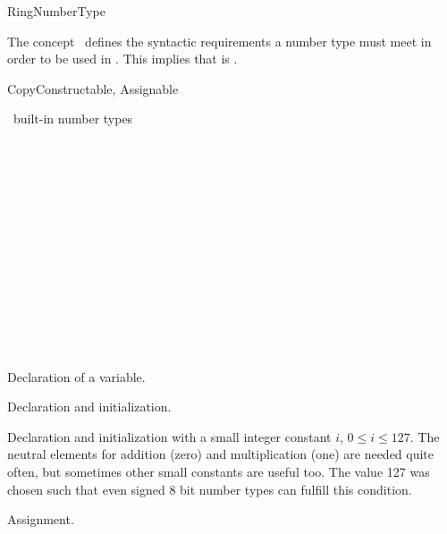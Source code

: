 \begin{ccRefConcept}{RingNumberType}

\ccDefinition

The concept \ccRefName\ defines the syntactic requirements a number type must
meet in order to be used in \cgal.  This implies that
 is 
.

\ccRefines

CopyConstructable, Assignable 


\ccHasModels

\CC\ built-in number types \\
 \\
 \\
 \\
 \\
 \\
 \\
 \\
 \\
 \\
 \\
 \\
 \\
 \\

\ccTypes

\ccSetTwoColumns{}{\hspace*{8.5cm}}
\ccCreation
{}

            {Declaration of a variable.}


            {Declaration and initialization.}


            {Declaration and initialization with a small integer
constant $i$, $0 \leq i \leq 127$. The neutral elements for addition
(zero) and multiplication (one) are needed quite often, but sometimes
other small constants are useful too. The value 127 was chosen such
that even signed 8 bit number types can fulfill this condition.  }

\ccOperations
{}
        {Assignment.  }



\end{ccRefConcept}

